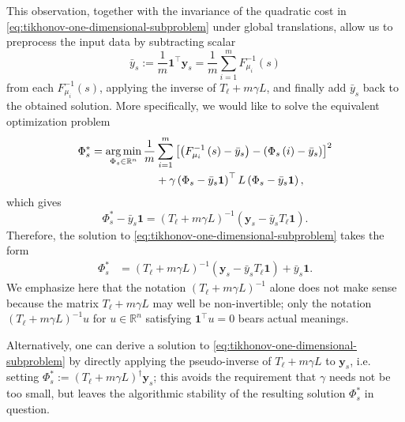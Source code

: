 \documentclass[letterpaper]{article} %
\begin{document}
This observation, together with the invariance of the quadratic cost in \eqref{eq:tikhonov-one-dimensional-subproblem} under global translations, allow us to preprocess the input data by subtracting scalar
\begin{equation}
  \label{eq:off-set-defn}
  \bar{y}_s := \frac{1}{m}\mathbf{1}^{\top}\mathbf{y}_s=\frac{1}{m}\sum_{i=1}^mF_{\mu_i}^{-1}\left( s \right)
\end{equation}
from each $F_{\mu_i}^{-1}\left( s \right)$, applying the inverse of $T_\ell+m\gamma L$, and finally add $\bar{y}_s$ back to the obtained solution. More specifically, we would like to solve the equivalent optimization problem
\begin{equation}
  \label{eq:tikhonov-one-dimensional-subproblem-equiv}
  \begin{aligned}
    \Phi_s^*=\mathop{\rm arg\, min}_{\Phi_s\in\mathbb{R}^n}\frac{1}{m}&\sum_{i=1}^m \left[\left( F_{\mu_i}^{-1}\left( s \right)-\bar{y}_s\right)-\left(\Phi_s \left( i \right)-\bar{y}_s \right)\right]^2\\
    &+\gamma \left(\Phi_s-\bar{y}_s\mathbf{1}\right)^{\top}L\left(\Phi_s-\bar{y}_s\mathbf{1}\right),
  \end{aligned}
\end{equation}
which gives
\begin{equation*}
  \Phi_s^*-\bar{y}_s\mathbf{1}=\left( T_{\ell}+m\gamma L \right)^{-1}\left(\mathbf{y}_s-\bar{y}_sT_\ell\mathbf{1}\right).
\end{equation*}
Therefore, the solution to \eqref{eq:tikhonov-one-dimensional-subproblem} takes the form
\begin{equation}
  \label{eq:sol-tikhonov-one-dimensional-subproblem}
  \begin{aligned}
    \Phi_s^{*}&=\left( T_{\ell}+m\gamma L \right)^{-1}\left(\mathbf{y}_s-\bar{y}_sT_\ell\mathbf{1}\right)+\bar{y}_s\mathbf{1}.
  \end{aligned}
\end{equation}
We emphasize here that the notation $\left( T_{\ell}+m\gamma L \right)^{-1}$ alone does not make sense because the matrix $T_{\ell}+m\gamma L$ may well be non-invertible; only the notation $\left( T_{\ell}+m\gamma L \right)^{-1}u$ for $u\in\mathbb{R}^n$ satisfying $\mathbf{1}^{\top}u=0$ bears actual meanings.
\begin{remark}
  Alternatively, one can derive a solution to \eqref{eq:tikhonov-one-dimensional-subproblem} by directly applying the pseudo-inverse of $T_{\ell}+m\gamma L$ to $\mathbf{y}_s$, i.e. setting $\Phi_s^{*}:=\left( T_{\ell}+m\gamma L \right)^{\dagger}\mathbf{y}_s$; this avoids the requirement that $\gamma$ needs not be too small, but leaves the algorithmic stability of the resulting solution $\Phi_s^{*}$ in question.
\end{remark}
\end{document}
